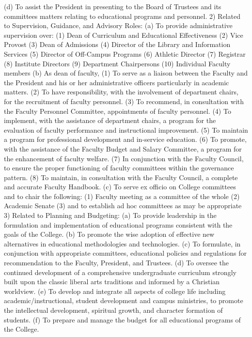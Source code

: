 \documentclass[letterpaper, 11pt]{article}
\begin{document}
(d) To assist the President in presenting to the Board of Trustees and its committees matters relating to educational programs and personnel.
2) Related to Supervision, Guidance, and Advisory Roles:
(a) To provide administrative supervision over:
(1) Dean of Curriculum and Educational Effectiveness 
(2) Vice Provost
(3) Dean of Admissions
(4) Director of the Library and Information Services
(5) Director of Off-Campus Programs
(6) Athletic Director
(7) Registrar
(8) Institute Directors
(9) Department Chairpersons
(10) Individual Faculty members
(b) As dean of faculty,
(1) To serve as a liaison between the Faculty and the President and his or her administrative officers particularly in academic matters.
(2) To have responsibility, with the involvement of department chairs, for the recruitment of faculty personnel.
(3) To recommend, in consultation with the Faculty Personnel Committee, appointments of faculty personnel.
(4) To implement, with the assistance of department chairs, a program for the evaluation of faculty performance and instructional improvement.
(5) To maintain a program for professional development and in-service education.
(6) To promote, with the assistance of the Faculty Budget and Salary Committee, a program for the enhancement of faculty welfare.
(7) In conjunction with the Faculty Council, to ensure the proper functioning of faculty committees within the governance pattern.
(8) To maintain, in consultation with the Faculty Council, a complete and accurate Faculty Handbook.
(c) To serve ex officio on College committees and to chair the following:
(1) Faculty meeting as a committee of the whole
(2) Academic Senate
(3) and to establish ad hoc committees as may be appropriate
3) Related to Planning and Budgeting:
(a) To provide leadership in the formulation and implementation of educational programs consistent with the goals of the College.
(b) To promote the wise adoption of effective new alternatives in educational methodologies and technologies.
(c) To formulate, in conjunction with appropriate committees, educational policies and regulations for recommendation to the Faculty, President, and Trustees.
(d) To oversee the continued development of a comprehensive undergraduate curriculum strongly built upon the classic liberal arts traditions and informed by a Christian worldview.
(e) To develop and integrate all aspects of college life including academic/instructional, student development and campus ministries, to promote the intellectual development, spiritual growth, and character formation of students.
(f) To prepare and manage the budget for all educational programs of the College.
\end{document}
